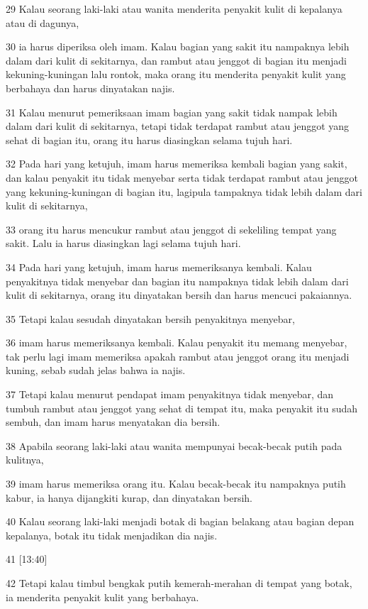 \par 29 Kalau seorang laki-laki atau wanita menderita penyakit kulit di kepalanya atau di dagunya,
\par 30 ia harus diperiksa oleh imam. Kalau bagian yang sakit itu nampaknya lebih dalam dari kulit di sekitarnya, dan rambut atau jenggot di bagian itu menjadi kekuning-kuningan lalu rontok, maka orang itu menderita penyakit kulit yang berbahaya dan harus dinyatakan najis.
\par 31 Kalau menurut pemeriksaan imam bagian yang sakit tidak nampak lebih dalam dari kulit di sekitarnya, tetapi tidak terdapat rambut atau jenggot yang sehat di bagian itu, orang itu harus diasingkan selama tujuh hari.
\par 32 Pada hari yang ketujuh, imam harus memeriksa kembali bagian yang sakit, dan kalau penyakit itu tidak menyebar serta tidak terdapat rambut atau jenggot yang kekuning-kuningan di bagian itu, lagipula tampaknya tidak lebih dalam dari kulit di sekitarnya,
\par 33 orang itu harus mencukur rambut atau jenggot di sekeliling tempat yang sakit. Lalu ia harus diasingkan lagi selama tujuh hari.
\par 34 Pada hari yang ketujuh, imam harus memeriksanya kembali. Kalau penyakitnya tidak menyebar dan bagian itu nampaknya tidak lebih dalam dari kulit di sekitarnya, orang itu dinyatakan bersih dan harus mencuci pakaiannya.
\par 35 Tetapi kalau sesudah dinyatakan bersih penyakitnya menyebar,
\par 36 imam harus memeriksanya kembali. Kalau penyakit itu memang menyebar, tak perlu lagi imam memeriksa apakah rambut atau jenggot orang itu menjadi kuning, sebab sudah jelas bahwa ia najis.
\par 37 Tetapi kalau menurut pendapat imam penyakitnya tidak menyebar, dan tumbuh rambut atau jenggot yang sehat di tempat itu, maka penyakit itu sudah sembuh, dan imam harus menyatakan dia bersih.
\par 38 Apabila seorang laki-laki atau wanita mempunyai becak-becak putih pada kulitnya,
\par 39 imam harus memeriksa orang itu. Kalau becak-becak itu nampaknya putih kabur, ia hanya dijangkiti kurap, dan dinyatakan bersih.
\par 40 Kalau seorang laki-laki menjadi botak di bagian belakang atau bagian depan kepalanya, botak itu tidak menjadikan dia najis.
\par 41 [13:40]
\par 42 Tetapi kalau timbul bengkak putih kemerah-merahan di tempat yang botak, ia menderita penyakit kulit yang berbahaya.
